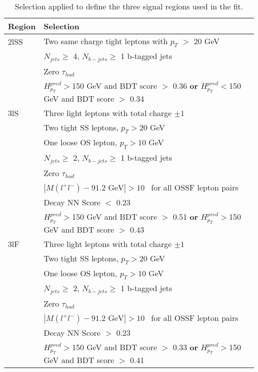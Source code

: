 \begin{table}[h!]
  \begin{center}
  \begin{tabular}{ll}
  \hline\hline
  Region & Selection \\
  \hline
  2lSS & Two same charge tight leptons with $p_T$ $>$ 20 GeV \\
  & $N_{jets}\geq$ 4, $N_{b-jets}\geq$ 1 b-tagged jets \\
  & Zero $\tau_{had}$\\
  & $H^{pred}_{p_T}>$150 GeV and BDT score $>$ 0.36 \textbf{or} $H^{pred}_{p_T}<$150 GeV and BDT score $>$ 0.34 \\
  \hline
  3lS & Three light leptons with total charge $\pm 1$ \\
  & Two tight SS leptons, $p_T > 20$ GeV \\
  & One loose OS lepton, $p_T > 10$ GeV \\
  & $N_{jets}\geq$ 2, $N_{b-jets}\geq$ 1 b-tagged jets \\
  & Zero $\tau_{had}$ \\           
  & $|M(l^+l^-)-91.2\textrm{ GeV}| > 10$~\GeV{} for all OSSF lepton pairs \\
  & Decay NN Score $<$ 0.23 \\
  & $H^{pred}_{p_T}>$150 GeV and BDT score $>$ 0.51 \textbf{or} $H^{pred}_{p_T}>$150 GeV and BDT score $>$ 0.43 \\
  \hline
  3lF & Three light leptons with total charge $\pm 1$ \\
  & Two tight SS leptons, $p_T > 20$ GeV \\                                                                                  
  & One loose OS lepton, $p_T > 10$ GeV \\                                                                                   
  & $N_{jets}\geq$ 2, $N_{b-jets}\geq$ 1 b-tagged jets \\
  & Zero $\tau_{had}$ \\
  & $|M(l^+l^-)-91.2\textrm{ GeV}| > 10$~\GeV{} for all OSSF lepton pairs \\                                                 
  & Decay NN Score $>$ 0.23 \\
  & $H^{pred}_{p_T}>$150 GeV and BDT score $>$ 0.33 \textbf{or} $H^{pred}_{p_T}>$150 GeV and BDT score $>$ 0.41 \\
  \hline\hline
  \end{tabular}
  \end{center}
  \caption{Selection applied to define the three signal regions used in the fit.}
  \label{tab:sigRegionCuts}
\end{table}

